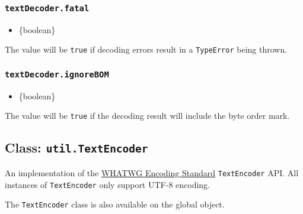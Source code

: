 \subsubsection{\texorpdfstring{\texttt{textDecoder.fatal}}{textDecoder.fatal}}\label{textdecoder.fatal}

\begin{itemize}
\tightlist
\item
  \{boolean\}
\end{itemize}

The value will be \texttt{true} if decoding errors result in a
\texttt{TypeError} being thrown.

\subsubsection{\texorpdfstring{\texttt{textDecoder.ignoreBOM}}{textDecoder.ignoreBOM}}\label{textdecoder.ignorebom}

\begin{itemize}
\tightlist
\item
  \{boolean\}
\end{itemize}

The value will be \texttt{true} if the decoding result will include the
byte order mark.

\subsection{\texorpdfstring{Class:
\texttt{util.TextEncoder}}{Class: util.TextEncoder}}\label{class-util.textencoder}

An implementation of the \href{https://encoding.spec.whatwg.org/}{WHATWG
Encoding Standard} \texttt{TextEncoder} API. All instances of
\texttt{TextEncoder} only support UTF-8 encoding.

\begin{Shaded}
\begin{Highlighting}[]
\OperatorTok{=}  \NormalTok{()}\OperatorTok{;}
\OperatorTok{=}\NormalTok{(}\NormalTok{)}\OperatorTok{;}
\end{Highlighting}
\end{Shaded}

The \texttt{TextEncoder} class is also available on the global object.

